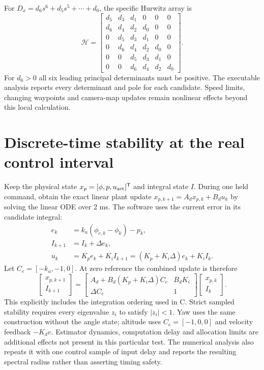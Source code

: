 For $D_x=d_6s^6+d_5s^5+\cdots+d_0$, the specific Hurwitz array is
\begin{equation}
\mathcal H=\begin{bmatrix}
d_5&d_3&d_1&0&0&0\\d_6&d_4&d_2&d_0&0&0\\
0&d_5&d_3&d_1&0&0\\0&d_6&d_4&d_2&d_0&0\\
0&0&d_5&d_3&d_1&0\\0&0&d_6&d_4&d_2&d_0
\end{bmatrix}.
\end{equation}
For $d_6>0$ all six leading principal determinants must be positive. The
executable analysis reports every determinant and pole for each candidate.
Speed limits, changing waypoints and camera-map updates remain nonlinear
effects beyond this local calculation.

\section{Discrete-time stability at the real control interval}
Keep the physical state $x_p=[\phi,p,u_{\rm act}]^{\mathsf T}$ and integral
state $I$. During one held command, obtain the exact linear plant update
$x_{p,k+1}=A_dx_{p,k}+B_du_k$ by solving the linear ODE over 2 ms.
The software uses the current error in its candidate integral:
\begin{align}
e_k&=k_a(\phi_{c,k}-\phi_k)-p_k,\\
I_{k+1}&=I_k+\Delta e_k,\\
u_k&=K_pe_k+K_iI_{k+1}=(K_p+K_i\Delta)e_k+K_iI_k.
\end{align}
Let $C_e=[-k_a,-1,0]$. At zero reference the combined update is therefore
\begin{equation}
\begin{bmatrix}x_{p,k+1}\\I_{k+1}\end{bmatrix}=
\begin{bmatrix}
A_d+B_d(K_p+K_i\Delta)C_e&B_dK_i\\
\Delta C_e&1
\end{bmatrix}
\begin{bmatrix}x_{p,k}\\I_k\end{bmatrix}.
\end{equation}
This explicitly includes the integration ordering used in C. Strict sampled
stability requires every eigenvalue $z_i$ to satisfy $|z_i|<1$. Yaw uses the
same construction without the angle state; altitude uses $C_e=[-1,0,0]$
and velocity feedback $-K_dv$. Estimator dynamics, computation delay and
allocation limits are additional effects not present in this particular test.
The numerical analysis also repeats it with one control sample of input delay
and reports the resulting spectral radius rather than asserting timing safety.

